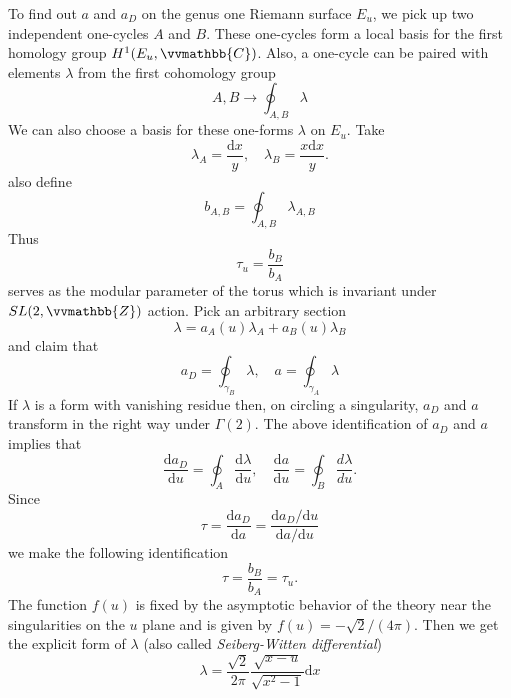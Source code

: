 \documentclass{article}
\begin{document}
To find out $a$ and $a_D$ on the genus one Riemann surface $E_u$, we pick up two independent one-cycles $A$ and $B$. These one-cycles form a local basis for the first homology group $H^1(E_u,\vvmathbb{C})$. Also, a one-cycle can be paired with elements $\lambda$ from the first cohomology group
\begin{equation}
A,B \rightarrow \oint_{A,B} \lambda
\end{equation}
We can also choose a basis for these one-forms $\lambda$ on $E_u$. Take
\begin{equation}
    \lambda_A=\frac{\mathrm{d}x}{y},\quad\lambda_B=\frac{x\mathrm{d}x}{y}.
\end{equation}
also define
\begin{equation}
    b_{A,B}=\oint_{A,B} \lambda_{A,B}
\end{equation}
Thus 
\begin{equation}
    \tau_u=\frac{b_B}{b_A}
\end{equation}
serves as the modular parameter of the torus which is invariant under $SL(2,\vvmathbb{Z})$ action. Pick an arbitrary section
\begin{equation}
\lambda=a_{A}(u) \lambda_{A}+a_{B}(u) \lambda_{B}
\end{equation}
and claim that
\begin{equation}
a_{D}=\oint_{\gamma_{B}} \lambda, \quad a=\oint_{\gamma_{A}} \lambda
\end{equation}
If $\lambda$ is a form with vanishing residue then, on circling a singularity, $a_D$ and $a$ transform in the right way under $\Gamma(2)$. The above identification of $a_{D}$ and $a$ implies that
\begin{equation}
    \frac{\mathrm{d} a_{D}}{\mathrm{d} u}=\oint_{A} \frac{\mathrm{d} \lambda}{\mathrm{d} u}, \quad \frac{\mathrm{d} a}{\mathrm{d} u}=\oint_{B} \frac{d \lambda}{d u} .
\end{equation}
Since
\begin{equation}
    \tau=\frac{\mathrm{d}a_D}{\mathrm{d}a}=\frac{\mathrm{d}a_D/\mathrm{d}u}{\mathrm{d}a/\mathrm{d}u}
\end{equation}
we make the following identification
\begin{equation}
\tau=\frac{b_{B}}{b_{A}}=\tau_{u} .
\end{equation}
The function $f(u)$ is fixed by the asymptotic behavior of the theory near the singularities on the $u$ plane and is given by $f(u)=-\sqrt{2} / (4 \pi)
$. Then we get the explicit form of $\lambda$ (also called \textit{Seiberg-Witten differential})
\begin{equation}
\label{eq:differential}
\lambda=\frac{\sqrt{2}}{2 \pi} \frac{ \sqrt{x-u}}{\sqrt{x^{2}-1}}\mathrm{d} x
\end{equation}
\end{document}
